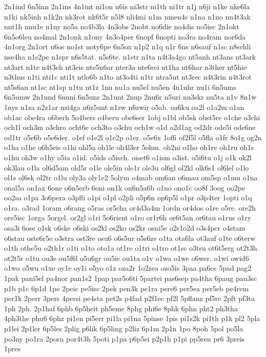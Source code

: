 {2n1ind
6n5inn
2n1ins
4n1int
ni1on
n6is
ni3str
ni1th
ni1tr
n1j
n6ji
n1ke
nke6la
n1ki
nk5inh
n1k2n
nk3rot
nk6t5r
n5l8
nli4mi
n1m
nmen4s
n1na
n1no
nn4t3ak
nnt1h
nnu1e
n1ny
no5a
no4b3la
4n3obs
2nobt
no6die
no4dis
no5isc
2n1okt
6n5o6leu
no4mal
2n1onk
n1ony
4n3o4per
6nopf
6nopti
no3ra
no4ram
nor6da
4n1org
2n1ort
n6os
no1st
noty6pe
6n5ox
n1p2
n1q
n1r
6ns
n6sauf
n1sc
n8schli
nse4ha
n1s2pe
n1spr
n6s5tat.
n5s6te.
n1str
n1ta
n4t3a4go
nt5anh
nt3ans
nt3ark
nt3art
n1te
n4t3eh
nt3eis
nte5n6ar
nter3a
nte6rei
nt1ha
nt6har
n3ther
nt5hie
n3thus
n1ti
nti1c
nti1t
ntlo6b
n1to
nt3o4ti
n1tr
ntra5ut
nt3rec
n4t3rin
n4t3rot
nt5s6an
nt1sc
nt1sp
n1tu
nt1z
1nu
nu1a
nu5el
nu5en
4n1uhr
nu1i
6n5ums
6n5umw
2n1und
6nuni
6n5unr
2n1unt
2nup
2nu6r
n5uri
nu3skr
nu5ta
n1v
8n1w
1nys
n1za
n2z1ar
nzi4ga
n6z5unt
n1zw
n6zwir
o5ab.
oa6ku
oa2l
o1a2m
o1an
ob1ac
obe4ra
o6berh
5o4bers
o4beru
obe6ser
1obj
o1bl
ob5sk
obst5re
o1che
o3chi
och1l
och3m
o3chro
ocht6e
och3to
o3chu
och1w
o1d
o2d1ag
od2dr
ode5i
ode6ne
od1tr
o5e6b
o5e6der.
o1ef
o1e2l
o1e2p
o1er.
o5e6x
1offi
of2f5l
o5fla
o1fr
8o1g
og2n
o1ha
o1he
o6h5eis
o1hi
ohl5a
oh1le
oh4l3er
5ohm.
oh2ni
o1ho
oh1re
oh1ru
oh1s
o1hu
oh3w
o1hy
o5ia
o1id.
o5ids
o5isch.
oiset6
o1ism
o3ist.
o5i6tu
o1j
o1k
ok2l
ok3lau
o1la
ol6d5am
old5r
o1le
ole5in
ole1r
ole3u
ol6gl
ol2kl
olk6s1
ol6lel
o1lo
ol1s
ol6sk
ol2tr
o1lu
oly3a
oly1e2
5olym
o4mab
om6an
o6mau
om5sp
o1mu
o1na
onal5a
on1ax
6one
o6n5erb
6oni
on1k
on6n5a6b
o1no
ono1c
oo8f
3oog
oo2pe
oo2sa
o1pa
3o6pera
o3pfli
o1pi
o1pl
o2pli
o5p6n
op6p5l
o1pr
o3p4ter
1opti
o1q
o1ra.
o3rad
1oram
o6rang
o5ras
or5cha
or4d3a4m
1ordn
or4dos
o1re
o5re.
ore2h
ore5isc
1orga
5orgel.
or2gl
o1ri
5o6rient
o1ro
or1r6h
or6t5an
or6tau
o1rus
o1ry
osa3i
6ose
o1sk
o6ske
o6ski
os2kl
os2ko
os2kr
osni5e
o2s1o2d
o3s4per
o4stam
o6stau
oste6r5e
o3stra
ost3re
osu6
o6s5ur
o5s6ze
o1ta
ota6la
ot3auf
o1te
o6terw
o1th
othe5u
o2th1r
o1ti
o1to
oto1a
ot1re
o1tri
o1tro
ot1sc
o3tsu
ot6t5erg
ot2t3h
ot2t5r
o1tu
ou3e
ou5f6l
o5u6gr
ou5ie
ou1ta
o1v
o1wa
o1we
o6wer.
o1wi
owid6
o1wo
o5wu
o1xe
oy1e
oy1i
o5yo
o1z
oza2r
1o2zea
ozo5is
3paa
pa6ce
5pad
pag2
1pak
pani5el
pa4nor
pan1s2
1pap
par5o6ti
5partei
pas6sep
pa4tha
6paug
pau3sc
p1b
p1c
6p1d
1pe
2peic
pe5isc
2pek
pen3k
pe1ra
pere6
per5ea
per5eb
pe4rem
per1k
2perr
3pers
4persi
pe4sta
pet2s
p4fad
p2f1ec
pf2l
5pflanz
pf5re
2pft
pf3ta
1ph
2ph.
2p1haf
6phb
6p5heit
ph5eme
8phg
phi6e
8phk
6phn
pht2
ph3tha
4ph3the
phu6
6phz
pi1en
pi5err
pi1la
pi1na
5pinse
1pis
pi1s2k
pi1th
p1k
pl2
5pla
p1lei
2p1ler
6p5les
2plig
p6lik
6p5ling
p2liz
6p1m
2p1n
1po
8poh
5pol
po5la
po3ny
po1ra
2porn
por4t3h
5poti
p1pa
p6p5ei
p2p1h
p1pi
pp5ren
pr6
3preis
1pres
}
